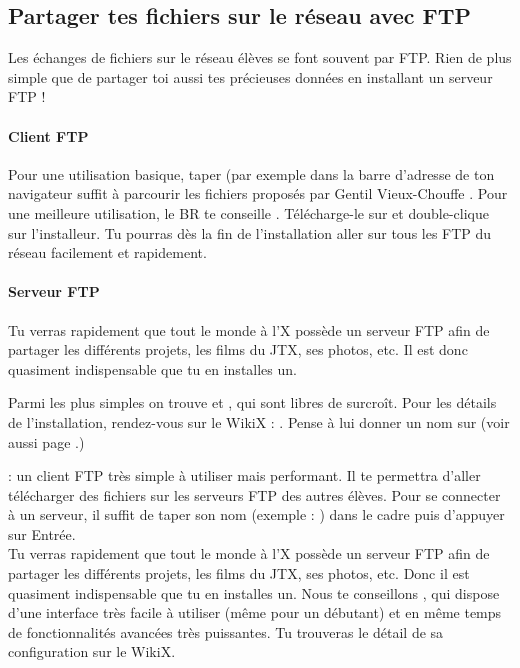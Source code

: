 \subsection{Partager tes fichiers sur le r\'eseau avec FTP}

Les \'echanges de fichiers sur le r\'eseau \'el\`eves se font souvent par FTP. Rien de plus simple que de partager toi aussi tes pr\'ecieuses donn\'ees en installant un serveur FTP !

\paragraph{Client FTP}
Pour une utilisation basique, taper   (par exemple  dans la barre d'adresse de ton navigateur suffit \`a parcourir les fichiers propos\'es par \og Gentil Vieux-Chouffe \fg.
Pour une meilleure utilisation, le BR te conseille . T\'el\'echarge-le sur  et double-clique sur l'installeur.
Tu pourras d\`es la fin de l'installation aller sur tous les FTP du r\'eseau
facilement et rapidement.

\paragraph{Serveur FTP}
Tu verras rapidement que tout le monde \`a  l'X poss\`ede un serveur FTP
afin de partager les diff\'erents projets, les films du JTX, ses
photos, etc. Il est donc quasiment indispensable que tu en installes
un.

Parmi les plus simples on trouve  et , qui sont libres de surcro\^{i}t. Pour les d\'etails de l'installation, rendez-vous sur le WikiX : .
Pense \`a lui donner un nom sur  (voir aussi page \pageref{dnsapp}.)

  : un client FTP tr\`es simple \`a  utiliser mais performant. Il te permettra d'aller t\'el\'echarger des fichiers sur les serveurs FTP des autres \'el\`eves.
Pour se connecter \`a  un serveur, il suffit de taper son nom (exemple : ) dans le cadre  puis d'appuyer sur Entr\'ee.\\
Tu verras rapidement que tout le monde \`a  l'X poss\`ede un serveur FTP afin de partager les diff\'erents projets, les films du JTX, ses photos, etc. Donc il est quasiment indispensable que tu en installes un. Nous te conseillons , qui dispose d'une interface tr\`es facile \`a  utiliser (m\^eme pour un d\'ebutant) et en m\^eme temps de fonctionnalit\'es avanc\'ees tr\`es puissantes. Tu trouveras le d\'etail de sa configuration sur le WikiX.


